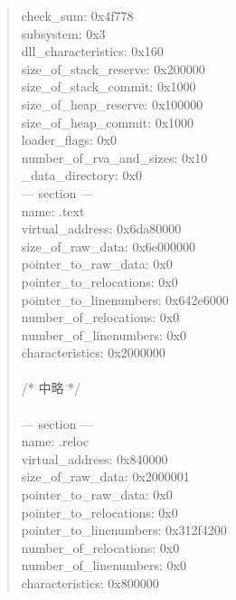 \documentclass[12pt,a4paper,dvipdfmx]{jsarticle}
\begin{document}
\begin{quote}
check\_sum:	0x4f778 \\
subsystem:	0x3 \\
dll\_characteristics:	0x160 \\
size\_of\_stack\_reserve:	0x200000 \\
size\_of\_stack\_commit:	0x1000 \\
size\_of\_heap\_reserve:	0x100000 \\
size\_of\_heap\_commit:	0x1000 \\
loader\_flags:	0x0 \\
number\_of\_rva\_and\_sizes:	0x10 \\
\_data\_directory:	0x0 \\
--- section --- \\
name:	.text \\
virtual\_address:	0x6da80000 \\
size\_of\_raw\_data:	0x6e000000 \\
pointer\_to\_raw\_data:	0x0 \\
pointer\_to\_relocations:	0x0 \\
pointer\_to\_linenumbers:	0x642e6000 \\
number\_of\_relocations:	0x0 \\
number\_of\_linenumbers:	0x0 \\
characteristics:	0x2000000 \\
 \\
/* 中略 */ \\
 \\
--- section --- \\
name:	 .reloc \\
virtual\_address:	0x840000 \\
size\_of\_raw\_data:	0x2000001 \\
pointer\_to\_raw\_data:	0x0 \\
pointer\_to\_relocations:	0x0 \\
pointer\_to\_linenumbers:	0x312f4200 \\
number\_of\_relocations:	0x0 \\
number\_of\_linenumbers:	0x0 \\
characteristics:	0x800000 \\
\end{quote}
\end{document}
